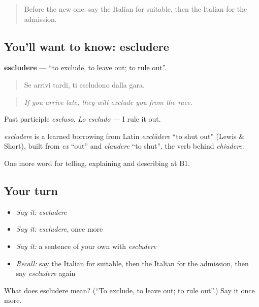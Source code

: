 \begin{quote}
Before the new one: say the Italian for suitable, then the Italian for the admission.
\end{quote}

\subsection*{You'll want to know: escludere}
\textbf{escludere} — \textquotedblleft{}to exclude, to leave out; to rule out\textquotedblright{}.

\begin{quote}
Se arrivi tardi, ti escludono dalla gara.
\end{quote}

\begin{quote}
\emph{If you arrive late, they will exclude you from the race.}
\end{quote}

Past participle \emph{escluso}. \emph{Lo escludo} — I rule it out.

\begin{cousinweb}
\emph{escludere} is a learned borrowing from Latin \emph{exclūdere} \textquotedblleft{}to shut out\textquotedblright{} (Lewis \& Short), built from \emph{ex} \textquotedblleft{}out\textquotedblright{} and \emph{claudere} \textquotedblleft{}to shut\textquotedblright{}, the verb behind \emph{chiudere}.
\end{cousinweb}

\begin{grammarlens}[title={What you've built}]
One more word for telling, explaining and describing at B1.
\end{grammarlens}

\subsection*{Your turn}
\begin{itemize}
\raggedright
  \item \emph{Say it:} \emph{escludere}
  \item \emph{Say it:} \emph{escludere}, once more
  \item \emph{Say it:} a sentence of your own with \emph{escludere}
  \item \emph{Recall:} say the Italian for suitable, then the Italian for the admission, then say \emph{escludere} again
\end{itemize}

\begin{tcolorbox}[breakable,colback=teal!4,colframe=teal!35!black,title={Before you move on}]
What does escludere mean? (\textquotedblleft{}To exclude, to leave out; to rule out\textquotedblright{}.) Say it once more.
\end{tcolorbox}
